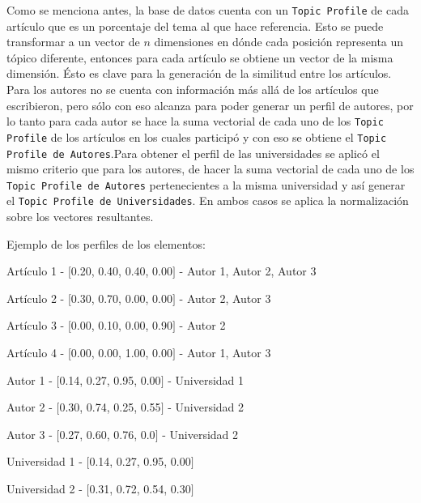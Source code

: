 Como se menciona antes, la base de datos cuenta con un \texttt{Topic Profile} de cada artículo que es un porcentaje del tema al que hace referencia. Esto se puede transformar a un vector de $n$ dimensiones en dónde cada posición representa un tópico diferente, entonces para cada artículo se obtiene un vector de la misma dimensión. Ésto es clave para la generación de la similitud entre los artículos.\\
Para los autores no se cuenta con información más allá de los artículos que escribieron, pero sólo con eso alcanza para poder generar un perfil de autores, por lo tanto para cada autor se hace la suma vectorial de cada uno de los \texttt{Topic Profile} de los artículos en los cuales participó y con eso se obtiene el \texttt{Topic Profile de Autores}.Para obtener el perfil de las universidades se aplicó el mismo criterio que para los autores, de hacer la suma vectorial de cada uno de los \texttt{Topic Profile de Autores} pertenecientes a la misma universidad y así generar el \texttt{Topic Profile de Universidades}. En ambos casos se aplica la normalización sobre los vectores resultantes.

Ejemplo de los perfiles de los elementos:

\begin{description}
 \item[Artículo - Topic Profile - Autores]
 \item Artículo 1 - $[$0.20, 0.40, 0.40, 0.00$]$ - Autor 1, Autor 2, Autor 3
 \item Artículo 2 - $[$0.30, 0.70, 0.00, 0.00$]$ - Autor 2, Autor 3
 \item Artículo 3 - $[$0.00, 0.10, 0.00, 0.90$]$ - Autor 2
 \item Artículo 4 - $[$0.00, 0.00, 1.00, 0.00$]$ - Autor 1, Autor 3
\end{description}

\begin{description}
 \item[Autor - Topic Profile - Universidad]
 \item Autor 1 - $[$0.14, 0.27, 0.95, 0.00$]$ - Universidad 1
 \item Autor 2 - $[$0.30, 0.74, 0.25, 0.55$]$ - Universidad 2
 \item Autor 3 - $[$0.27, 0.60, 0.76, 0.0$]$ - Universidad 2
\end{description}

\begin{description}
 \item[Universidad - Topic Profile]
 \item Universidad 1 - $[$0.14, 0.27, 0.95, 0.00$]$
 \item Universidad 2 - $[$0.31, 0.72, 0.54, 0.30$]$
\end{description}

